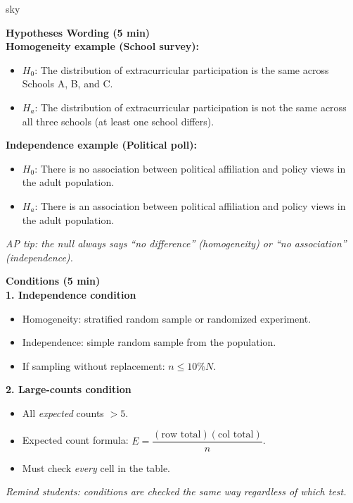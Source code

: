 \documentclass[10pt]{article}
\begin{document}
\begin{skillbox}{sky}
\begin{minipage}[t]{0.48\linewidth}
    \textbf{Hypotheses Wording (5 min)}\\[4pt]
    \textbf{Homogeneity example (School survey):}
    \begin{itemize}
        \item $H_0$: The distribution of extracurricular participation is the same
              across Schools A, B, and C.
        \item $H_a$: The distribution of extracurricular participation is not the
              same across all three schools (at least one school differs).
    \end{itemize}
    \textbf{Independence example (Political poll):}
    \begin{itemize}
        \item $H_0$: There is no association between political affiliation and policy
              views in the adult population.
        \item $H_a$: There is an association between political affiliation and policy
              views in the adult population.
    \end{itemize}
    \textit{AP tip: the null always says ``no difference'' (homogeneity) or
    ``no association'' (independence).}
\end{minipage}
\hfill
\begin{minipage}[t]{0.48\linewidth}
    \textbf{Conditions (5 min)}\\[4pt]
    \textbf{1. Independence condition}
    \begin{itemize}
        \item Homogeneity: stratified random sample or randomized experiment.
        \item Independence: simple random sample from the population.
        \item If sampling without replacement: $n \le 10\%N$.
    \end{itemize}
    \textbf{2. Large-counts condition}
    \begin{itemize}
        \item All \emph{expected} counts $> 5$.
        \item Expected count formula: $E = \dfrac{(\text{row total})(\text{col total})}{n}$.
        \item Must check \emph{every} cell in the table.
    \end{itemize}
    \textit{Remind students: conditions are checked the same way regardless of which test.}
\end{minipage}
\end{skillbox}
\end{document}
